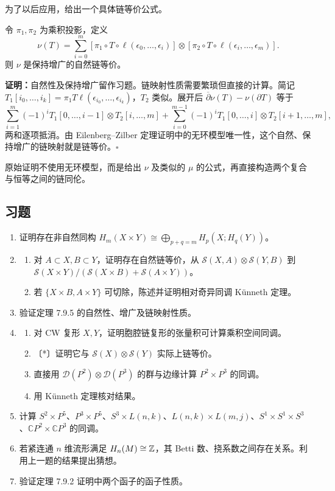 为了以后应用，给出一个具体链等价公式。

令 $\pi_1,\pi_2$ 为乘积投影，定义
\[
\nu(T)=\sum_{i=0}^m[\pi_1\circ T\circ\ell(\epsilon_0,\ldots,\epsilon_i)]
\otimes[\pi_2\circ T\circ\ell(\epsilon_i,\ldots,\epsilon_m)].
\]
则 $\nu$ 是保持增广的自然链等价。

\textbf{证明：}自然性及保持增广留作习题。链映射性质需要繁琐但直接的计算。简记 $T_1[i_0,\ldots,i_k]=\pi_1T\ell(\epsilon_{i_0},\ldots,\epsilon_{i_k})$，$T_2$ 类似。展开后 $\overline\partial\nu(T)-\nu(\partial T)$ 等于
\[
\sum_{i=1}^{m}(-1)^iT_1[0,\ldots,i-1]\otimes T_2[i,\ldots,m]
+\sum_{i=0}^{m-1}(-1)^iT_1[0,\ldots,i]\otimes T_2[i+1,\ldots,m],
\]
两和逐项抵消。由 Eilenberg--Zilber 定理证明中的无环模型唯一性，这个自然、保持增广的链映射就是链等价。\hfill$\square$

原始证明不使用无环模型，而是给出 $\nu$ 及类似的 $\mu$ 的公式，再直接构造两个复合与恒等之间的链同伦。

\subsection*{习题}
\begin{enumerate}
\item 证明存在非自然同构 $H_m(X\times Y)\cong\bigoplus_{p+q=m}H_p(X;H_q(Y))$。
\item \begin{enumerate}[label=(\alph*)]
\item 对 $A\subset X,B\subset Y$，证明存在自然链等价，从 $\mathcal S(X,A)\otimes\mathcal S(Y,B)$ 到 $\mathcal S(X\times Y)/(\mathcal S(X\times B)+\mathcal S(A\times Y))$。
\item 若 $\{X\times B,A\times Y\}$ 可切除，陈述并证明相对奇异同调 Künneth 定理。
\end{enumerate}
\item 验证定理 7.9.5 的自然性、增广及链映射性质。
\item \begin{enumerate}[label=(\alph*)]
\item 对 CW 复形 $X,Y$，证明胞腔链复形的张量积可计算乘积空间同调。
\item 〔*〕证明它与 $\mathcal S(X)\otimes\mathcal S(Y)$ 实际上链等价。
\item 直接用 $\mathcal D(P^2)\otimes\mathcal D(P^3)$ 的群与边缘计算 $P^2\times P^3$ 的同调。
\item 用 Künneth 定理核对结果。
\end{enumerate}
\item 计算 $S^2\times P^5$、$P^3\times P^5$、$S^3\times L(n,k)$、$L(n,k)\times L(m,j)$、$S^1\times S^1\times S^3$、$\mathbb CP^2\times\mathbb CP^3$ 的同调。
\item 若紧连通 $n$ 维流形满足 $H_n(M)\cong\mathbb{Z}$，其 Betti 数、挠系数之间存在关系。利用上一题的结果提出猜想。
\item 验证定理 7.9.2 证明中两个函子的函子性质。
\end{enumerate}
